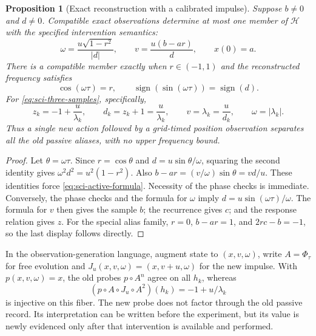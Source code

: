 \documentclass[11pt]{article}
\newtheorem{proposition}[theorem]{Proposition}
\theoremstyle{definition}
\begin{document}
\begin{proposition}[Exact reconstruction with a calibrated impulse]
\label{prop:sci-active-reconstruction}
Suppose $b\ne0$ and $d\ne0$. Compatible exact observations determine at most
one member of $\mathcal H$ with the specified intervention semantics:
\begin{equation}\label{eq:sci-active-formula}
 \omega=\frac{u\sqrt{1-r^2}}{|d|},\qquad
 v=\frac{u(b-ar)}{d},\qquad x(0)=a.
\end{equation}
There is a compatible member exactly when $r\in(-1,1)$ and the reconstructed
frequency satisfies
\[
 \cos(\omega\tau)=r,
 \qquad
 \operatorname{sign}(\sin(\omega\tau))=\operatorname{sign}(d).
\]
For \eqref{eq:sci-three-samples}, specifically,
\[
 z_k=-1+\frac{u}{\lambda_k},\qquad
 d_k=z_k+1=\frac{u}{\lambda_k},\qquad
 v=\lambda_k=\frac{u}{d_k},\qquad\omega=|\lambda_k|.
\]
Thus a single new action followed by a grid-timed position observation
separates all the old passive aliases, with no upper frequency bound.
\end{proposition}
\begin{proof}
Let $\theta=\omega\tau$. Since $r=\cos\theta$ and
$d=u\sin\theta/\omega$, squaring the second identity gives
$\omega^2d^2=u^2(1-r^2)$. Also
$b-ar=(v/\omega)\sin\theta=vd/u$. These identities force
\eqref{eq:sci-active-formula}. Necessity of the phase checks is immediate.
Conversely, the phase checks and the formula for $\omega$ imply
$d=u\sin(\omega\tau)/\omega$. The formula for $v$ then gives the sample $b$;
the recurrence gives $c$; and the response relation gives $z$.
For the special alias family, $r=0$, $b-ar=1$, and $2rc-b=-1$,
so the last display follows directly.
\end{proof}

In the observation-generation language, augment state to $(x,v,\omega)$,
write $A=\Phi_\tau$ for free evolution and $J_u(x,v,\omega)=(x,v+u,\omega)$
for the new impulse. With $p(x,v,\omega)=x$, the old probes $p\circ A^n$
agree on all $h_k$, whereas
\[
 (p\circ A\circ J_u\circ A^2)(h_k)=-1+u/\lambda_k
\]
is injective on this fiber. The new probe does not factor through the old
passive record. Its interpretation can be written before the experiment,
but its value is newly evidenced only after that intervention is available
and performed.
\end{document}

